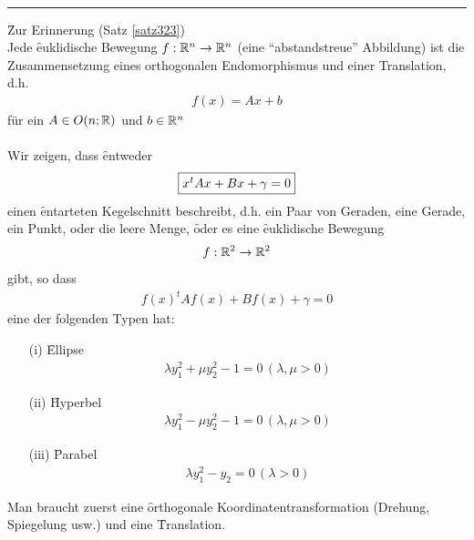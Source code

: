\vspace*{0.2cm} \\ \rule{\linewidth}{0.3mm}\vspace*{0.1cm}
\f{Zur Erinnerung} (Satz \ref{satz323}) \\
Jede \f{euklidische Bewegung} $f: \mathbb{R}^n \rightarrow \mathbb{R}^n$ (eine ``abstandstreue'' Abbildung) ist die Zusammensetzung eines orthogonalen Endomorphismus und einer Translation, d.h. 
\begin{align}
f(x) = Ax + b
\end{align}
für ein $A \in O(n; \mathbb{R})$ und $b \in \mathbb{R}^n$ \\\\
Wir zeigen, dass \f{entweder}
\begin{align} 
\fbox{$x^t A x + B x + \gamma = 0$} 
\end{align}
einen \f{entarteten} Kegelschnitt beschreibt, d.h. ein Paar von Geraden, eine Gerade, ein Punkt, oder die leere Menge, 
\f{oder} es eine \f{euklidische Bewegung} 
\begin{align}
f: \mathbb{R}^2 \rightarrow \mathbb{R}^2 
\end{align}
gibt, so dass
\begin{align}
f(x)^t A f(x) + B f(x) + \gamma = 0
\end{align}
eine der folgenden Typen hat:
\begin{itemize}
\item[(i)] \f{Ellipse} 
\begin{align}
\lambda y_{1}^{2} + \mu y_{2}^{2} -1 = 0\, (\lambda, \mu > 0) 
\end{align}

\item[(ii)] \f{Hyperbel}
\begin{align}
\lambda y_{1}^{2} - \mu y_{2}^{2} -1 = 0\, (\lambda, \mu > 0) 
\end{align}

\item[(iii)] \f{Parabel}
\begin{align}
\lambda y_{1}^{2} - y_{2} = 0\, (\lambda > 0) 
\end{align}
\end{itemize}
Man braucht zuerst eine \f{orthogonale} Koordinatentransformation (Drehung, Spiegelung usw.) und eine \f{Translation}.

